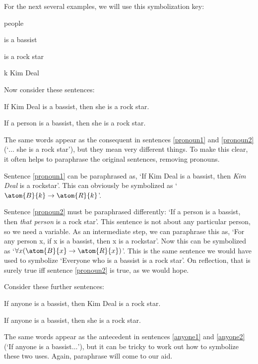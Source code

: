 For the next several examples, we will use this symbolization key:
	\begin{ekey}
		\item[\text{domain}] people
		\item[\atom{B}{x}]  is a bassist
		\item[\atom{R}{x}]  is a rock star
		\item[k] Kim Deal
	\end{ekey}
Now consider these sentences:
	\begin{earg}
		\item[\ex{pronoun1}] If Kim Deal is a bassist, then she is a rock star.
		\item[\ex{pronoun2}] If a person is a bassist, then she is a rock star.
	\end{earg}
The same words appear as the consequent in sentences \ref{pronoun1} and \ref{pronoun2} (`$\ldots$ she is a rock star'), but they mean very different things. To make this clear, it often helps to paraphrase the original sentences, removing pronouns.

Sentence \ref{pronoun1} can be paraphrased as, `If Kim Deal is a bassist, then \emph{Kim Deal} is a rockstar'. This can obviously be symbolized as `$\atom{B}{k} \eif \atom{R}{k}$'.

Sentence \ref{pronoun2} must be paraphrased differently: `If a person is a bassist, then \emph{that person} is a rock star'. This sentence is not about any particular person, so we need a variable. As an intermediate step, we can paraphrase this as, `For any person x, if x is a bassist, then x is a rockstar'. Now this can be symbolized as `$\forall x (\atom{B}{x} \eif \atom{R}{x})$'. This is the same sentence we would have used to symbolize `Everyone who is a bassist is a rock star'. On reflection, that is surely true iff sentence \ref{pronoun2} is true, as we would hope.

Consider these further sentences:
	\begin{earg}
		\item[\ex{anyone1}] If anyone is a bassist, then Kim Deal is a rock star.
		\item[\ex{anyone2}] If anyone is a bassist, then she is a rock star.
	\end{earg}
The same words appear as the antecedent in sentences \ref{anyone1} and \ref{anyone2}  (`If anyone is a bassist$\ldots$'), but it can be tricky to work out how to symbolize these two uses. Again, paraphrase will come to our aid.

